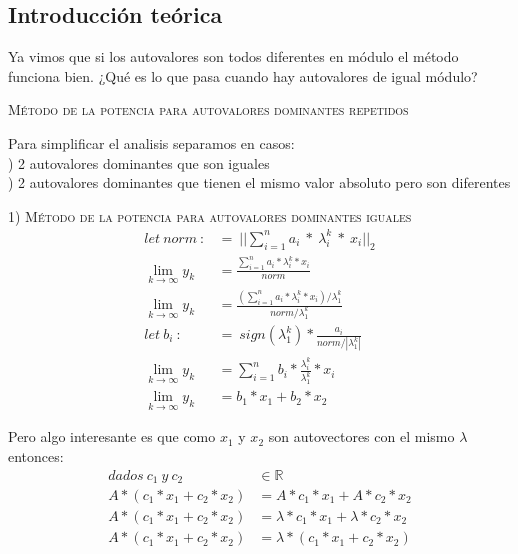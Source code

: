 
\vspace{1em}
\subsection{Introducción teórica} Ya vimos que si los autovalores son todos diferentes en módulo el método funciona bien. 
¿Qué es lo que pasa cuando hay autovalores de igual módulo?


\vspace{2em}
\noindent \textsc{Método de la potencia para autovalores dominantes repetidos}

\vspace{2em}
\noindent Para simplificar el analisis separamos en casos: \\
) 2 autovalores dominantes que son iguales \\
) 2 autovalores dominantes que tienen el mismo valor absoluto pero son diferentes
\vspace{2em}



\noindent \textsc{1) Método de la potencia para autovalores dominantes iguales}
\begin{align}
    let \ norm \ :&= \ ||\sum_{i=1}^{n} a_i \ * \ \lambda_{i}^{k} \ * \ x_i||_2 \\
    \lim_{k \to \infty} y_k &= \frac{\sum_{i=1}^{n} a_i * \lambda_{i}^{k} * x_i }{norm} \\ 
    \lim_{k \to \infty} y_k &= \frac{(\sum_{i=1}^{n} a_i * \lambda_{i}^{k} * x_i) / \lambda_{1}^{k}}{norm / \lambda_{1}^{k}} \\
    let \ b_i \ :&= \ sign(\lambda_{1}^{k}) * \frac{a_i}{norm / |\lambda_{1}^{k}|} \\
    \lim_{k \to \infty} y_k &= \sum_{i=1}^{n} b_i * \frac{\lambda_{i}^{k}}{\lambda_{1}^{k}} * x_i \\
    \lim_{k \to \infty} y_k &= b_1 * x_1 + b_2 * x_2 
\end{align}

\vspace{1em}
Pero algo interesante es que como $x_1$ y $x_2$ son autovectores con el mismo $\lambda$ entonces:
\begin{align}
    dados\ c_1 \ y \ c_2 &\in \mathbb{R} \\
    A * (c_1 * x_1 + c_2 * x_2) &= A * c_1 * x_1 + A * c_2 * x_2 \\
    A * (c_1 * x_1 + c_2 * x_2) &= \lambda * c_1 * x_1 + \lambda * c_2 * x_2 \\
    A * (c_1 * x_1 + c_2 * x_2) &= \lambda * (c_1 * x_1 + c_2 * x_2) 
\end{align}

